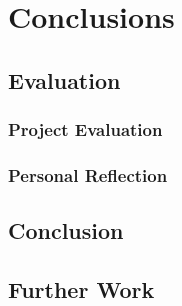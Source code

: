 \documentclass[12pt]{report}
\begin{document}
\part{Conclusions}
\chapter{Evaluation}
\section{Project Evaluation}


\section{Personal Reflection}


\chapter{Conclusion}

\chapter{Further Work}



\cleardoublepage
{}
{}
\end{document}
